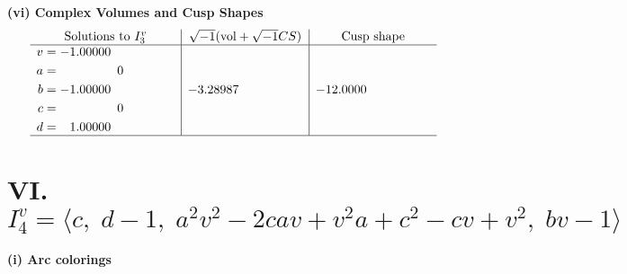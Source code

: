 \documentclass[1p]{elsarticle_modified}
\theoremstyle{definition}
\newcommand{\I}{\sqrt{-1}}
\begin{document}
\newpage\flushleft \textbf{(vi) Complex Volumes and Cusp Shapes}
$$\begin{array}{c|c|c}  
\text{Solutions to }I^v_{3}& \I (\text{vol} + \sqrt{-1}CS) & \text{Cusp shape}\\
 \hline 
\begin{aligned}
v &= -1.00000\phantom{ +0.000000I} \\
a &= \phantom{-0.000000 } 0 \\
b &= -1.00000\phantom{ +0.000000I} \\
c &= \phantom{-0.000000 } 0 \\
d &= \phantom{-}1.00000\phantom{ +0.000000I}\end{aligned}
 & -3.28987\phantom{ +0.000000I} & -12.0000\phantom{ +0.000000I}\\
 \hline 
 \end{array}$$\newpage\newpage\renewcommand{\arraystretch}{1}
\centering \section*{VI. $I^v_{4}= \langle c,\;d-1,\;a^2 v^2-2 c a v+v^2 a+c^2- c v+v^2,\;b v-1 \rangle$}
\flushleft \textbf{(i) Arc colorings}\\
\end{document}
